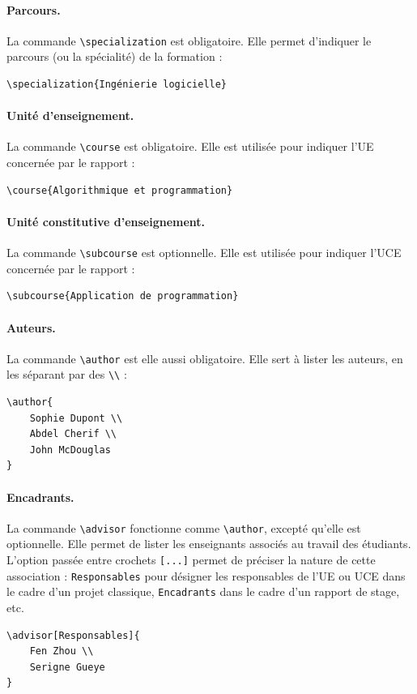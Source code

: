 \documentclass{ceri/sty/rapport}
\begin{document}
\paragraph{Parcours.} La commande \texttt{\textbackslash{}specialization} est obligatoire. Elle permet d'indiquer le parcours (ou la spécialité) de la formation :
\begin{lstlisting}[language={[LaTeX]TeX}, numbers=none]
\specialization{Ingénierie logicielle}
\end{lstlisting}

\paragraph{Unité d'enseignement.} La commande \texttt{\textbackslash{}course} est obligatoire. Elle est utilisée pour indiquer l'UE concernée par le rapport :
\begin{lstlisting}[language={[LaTeX]TeX}, numbers=none]
\course{Algorithmique et programmation}
\end{lstlisting}

\paragraph{Unité constitutive d'enseignement.} La commande \texttt{\textbackslash{}subcourse} est optionnelle. Elle est utilisée pour indiquer l'UCE concernée par le rapport :
\begin{lstlisting}[language={[LaTeX]TeX}, numbers=none]
\subcourse{Application de programmation}
\end{lstlisting}

\paragraph{Auteurs.} La commande \texttt{\textbackslash{}author} est elle aussi obligatoire. Elle sert à lister les auteurs, en les séparant par des \texttt{\textbackslash{}\textbackslash{}} :
\begin{lstlisting}[language={[LaTeX]TeX}, numbers=none]
\author{
	Sophie Dupont \\
	Abdel Cherif \\
	John McDouglas
} 
\end{lstlisting}

\paragraph{Encadrants.} La commande \texttt{\textbackslash{}advisor} fonctionne comme \texttt{\textbackslash{}author}, excepté qu'elle est optionnelle. Elle permet de lister les enseignants associés au travail des étudiants. L'option passée entre crochets \texttt{[...]} permet de préciser la nature de cette association : \texttt{Responsables} pour désigner les responsables de l'UE ou UCE dans le cadre d'un projet classique, \texttt{Encadrants} dans le cadre d'un rapport de stage, etc.
\begin{lstlisting}[language={[LaTeX]TeX}, numbers=none]
\advisor[Responsables]{
	Fen Zhou \\
	Serigne Gueye
} 
\end{lstlisting}
\end{document}

